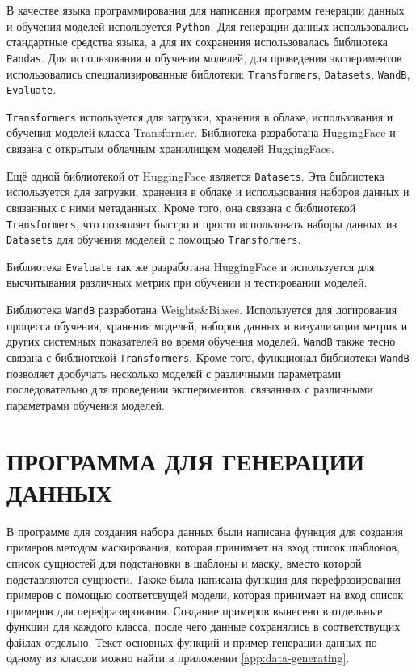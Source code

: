 В качестве языка программирования для написания программ генерации данных и обучения моделей используется \texttt{Python}.
Для генерации данных использовались стандартные средства языка, а для их сохранения использовалась библиотека \texttt{Pandas}. Для использования и обучения моделей, для проведения экспериментов использовались специализированные библотеки: \texttt{Transformers}, \texttt{Datasets}, \texttt{WandB}, \texttt{Evaluate}.

\texttt{Transformers} используется для загрузки, хранения в облаке, использования и обучения моделей класса Transformer. Библиотека разработана 
HuggingFace и связана с открытым облачным хранилищем моделей HuggingFace. 

Ещё одной библиотекой от HuggingFace является \texttt{Datasets}. Эта библиотека используется для загрузки, хранения в облаке и использования 
наборов данных и связанных с ними метаданных. Кроме того, она связана с библиотекой \texttt{Transformers}, что позволяет быстро и просто 
использовать наборы данных из \texttt{Datasets} для обучения моделей с помощью \texttt{Transformers}.

Библиотека \texttt{Evaluate} так же разработана HuggingFace и используется для высчитывания различных метрик при обучении и тестировании моделей.

Библиотека \texttt{WandB} разработана Weights\&Biases. Используется для логирования процесса обучения, хранения моделей, наборов данных 
и визуализации метрик и других системных показателей во время обучения моделей. \texttt{WandB} также тесно связана с библиотекой 
\texttt{Transformers}. Кроме того, функционал библиотеки \texttt{WandB} позволяет дообучать несколько моделей с различными 
параметрами последовательно для проведении экспериментов, связанных с различными параметрами обучения моделей.

\section{ПРОГРАММА ДЛЯ ГЕНЕРАЦИИ ДАННЫХ}
В программе для создания набора данных были написана функция для создания примеров методом маскирования, которая принимает на вход список шаблонов, список сущностей для подстановки в шаблоны и маску, вместо которой подставляются сущности. Также была написана функция для перефразирования примеров с помощью соответсвущей модели, которая принимает на вход список примеров для перефразирования. Создание примеров вынесено в отдельные функции для каждого класса, после чего данные сохранялись в соответствущих файлах отдельно. Текст основных функций и пример генерации данных по одному из классов можно найти в приложении \ref{app:data-generating}.

